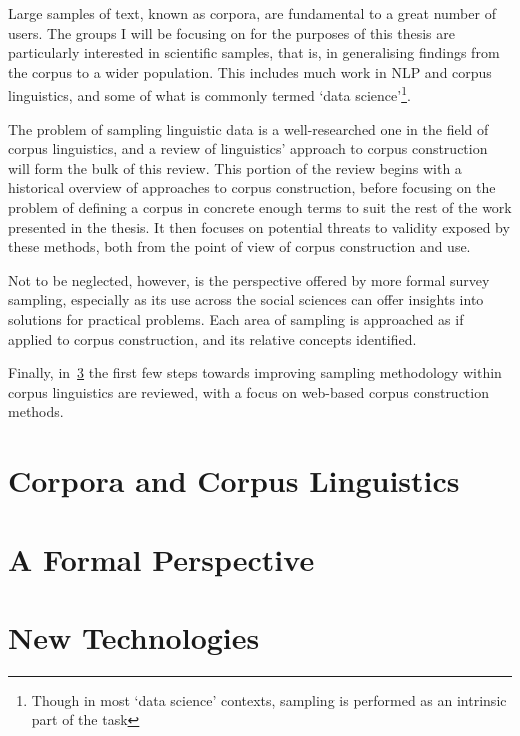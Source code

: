 Large samples of text, known as corpora, are fundamental to a great number of users.  The groups I will be focusing on for the purposes of this thesis are particularly interested in scientific samples, that is, in generalising findings from the corpus to a wider population.  This includes much work in NLP and corpus linguistics, and some of what is commonly termed `data science'\footnote{Though in most `data science' contexts, sampling is performed as an intrinsic part of the task}.


The problem of sampling linguistic data is a well-researched one in the field of corpus linguistics, and a review of linguistics' approach to corpus construction will form the bulk of this review.  This portion of the review begins with a historical overview of approaches to corpus construction, before focusing on the problem of defining a corpus in concrete enough terms to suit the rest of the work presented in the thesis.  It then focuses on potential threats to validity exposed by these methods, both from the point of view of corpus construction and use.

Not to be neglected, however, is the perspective offered by more formal survey sampling, especially as its use across the social sciences can offer insights into solutions for practical problems.  Each area of sampling is approached as if applied to corpus construction, and its relative concepts identified.

Finally, in~\ref{sec:litreview:newtech} the first few steps towards improving sampling methodology within corpus linguistics are reviewed, with a focus on web-based corpus construction methods.




\section{Corpora and Corpus Linguistics}
\label{sec:litreview:corpora}




\section{A Formal Perspective}
\label{sec:litreview:sampling}




\section{New Technologies} %
\label{sec:litreview:newtech}


